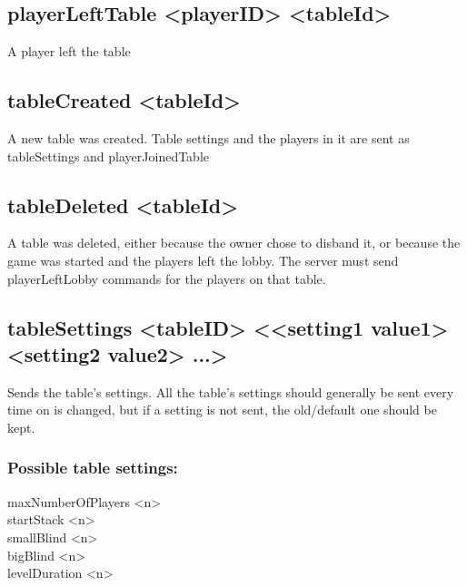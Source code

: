 \documentclass{article}
\begin{document}
\subsection*{playerLeftTable <playerID> <tableId>}
A player left the table

\subsection*{tableCreated <tableId>}
A new table was created. Table settings and the players in it are sent as tableSettings and playerJoinedTable

\subsection*{tableDeleted <tableId>}
A table was deleted, either because the owner chose to disband it, or because the game was started and the players left the lobby. The server must send playerLeftLobby commands for the players on that table.

\subsection*{tableSettings <tableID> <{}<setting1 value1> <setting2 value2> ...>}
Sends the table's settings. All the table's settings should generally be sent every time on is changed, but if a setting is not sent, the old/default one should be kept.

\subsubsection*{Possible table settings:}
\begin{description}
\item[maxNumberOfPlayers <n>]
\item[startStack <n>]
\item[smallBlind <n>]
\item[bigBlind <n>]
\item[levelDuration <n>]
\end{description}
\end{document}
